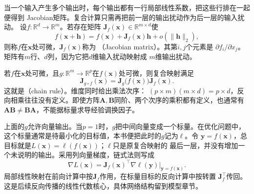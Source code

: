 当一个输入产生多个输出时，每个输出都有一行局部线性系数，把这些行排在一起便得到
Jacobian矩阵。复合计算只需再把前一层的输出扰动作为后一层的输入扰动。
设$f:\mathbb{R}^d\to\mathbb{R}^m$。若存在矩阵 $\bm{J}_f(\bm{x})\in\mathbb{R}^{m\times d}$使
\begin{equation}
  f(\bm{x}+\bm{h})
  =
  f(\bm{x})+\bm{J}_f(\bm{x})\bm{h}
  +o(\lVert\bm{h}\rVert_2),
\label{eq:analysis-jacobian-linearization}
\end{equation}
则称$f$在$\bm{x}$处可微，$\bm{J}_f(\bm{x})$称为
（Jacobian matrix）。其第$i,j$个元素是 $\partial f_i/\partial x_j$。矩阵有$m$行、$d$列，因为它把$d$维输入扰动映射成 $m$维输出扰动。

若$f$在$\bm{x}$处可微，且$g:\mathbb{R}^m\to\mathbb{R}^p$在$f(\bm{x})$处可微，则复合映射满足
\begin{equation}
  \bm{J}_{g\circ f}(\bm{x})
  =
  \bm{J}_g\bigl(f(\bm{x})\bigr)\bm{J}_f(\bm{x}).
\label{eq:analysis-vector-chain-rule}
\end{equation}
这就是（chain rule）。维度同时给出乘法次序： $(p\times m)(m\times d)=p\times d$，反向相乘往往没有定义。即使方阵$\bm A,\bm B$同阶、两个次序的乘积都有定义，也通常有$\bm A\bm B\neq\bm B\bm A$，不能据标量求导经验调换因子。

上面的$g$允许向量输出。当$p=1$时，$g$把中间向量变成一个标量。在优化问题中，
这个标量通常是待最小化的目标值，本书便把此时的$g$记为$\ell$。令
$\bm y=f(\bm x)$，总目标就是$L(\bm x)=\ell(f(\bm x))$；$\ell$只是原复合映射的
最后一层，并没有增加一个未说明的输出。采用列向量梯度，链式法则写成
\[
  \nabla L(\bm x)
  =\bm J_f(\bm x)^\top\nabla\ell(\bm y)\big|_{\bm y=f(\bm x)}.
\]
局部线性映射在前向计算中按$\bm J_f$作用，在标量目标的反向计算中按转置
$\bm J_f^\top$传回。这是后续反向传播的线性代数核心，具体网络结构留到模型章节。

